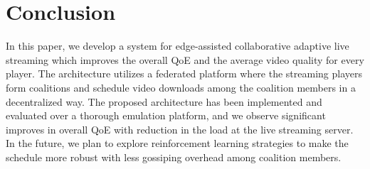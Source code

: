 \section{Conclusion}
In this paper, we develop a system for edge-assisted collaborative adaptive live streaming which improves the overall QoE and the average video quality for every player. The architecture utilizes a federated platform where the streaming players form coalitions and schedule video downloads among the coalition members in a decentralized way. The proposed architecture has been implemented and evaluated over a thorough emulation platform, and we observe significant improves in overall QoE with reduction in the load at the live streaming server. In the future, we plan to explore reinforcement learning strategies to make the schedule more robust with less gossiping overhead among coalition members. 